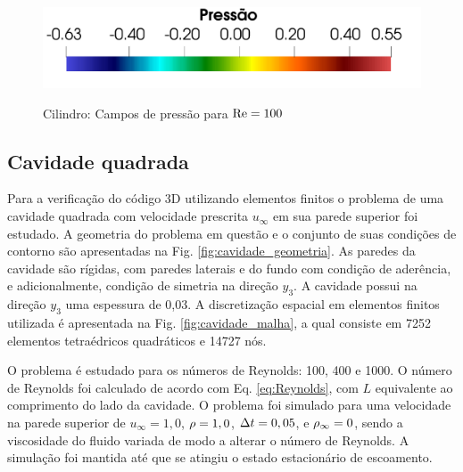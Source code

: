 \documentclass[tese_patricia]{subfiles}%
\begin{document}
\begin{figure}[htb!]
	{\includegraphics[trim=0cm 0cm 0cm 0cm,clip=true,scale=0.3]{Imagens/Cap2/cilindro_legendaPress.pdf}} \\
	\caption{Cilindro: Campos de pressão para $\mathrm{Re} = 100$}
	\label{fig:cilindro_camposPressao}
\end{figure}


\subsection{Cavidade quadrada} \label{capitulo:Cap2:VerApl:CavQuad}

Para a verificação do código 3D utilizando elementos finitos o problema de uma cavidade quadrada com velocidade prescrita $u_{\infty}$ em sua parede superior foi estudado. A geometria do problema em questão e o conjunto de suas condições de contorno são apresentadas na Fig. \ref{fig:cavidade_geometria}. As paredes da cavidade são rígidas, com paredes laterais e do fundo com condição de aderência, e adicionalmente, condição de simetria na direção $y_3$. A cavidade possui na direção $y_3$ uma espessura de 0,03. A discretização espacial em elementos finitos utilizada é apresentada na Fig.  \ref{fig:cavidade_malha}, a qual consiste em 7252 elementos tetraédricos quadráticos e 14727 nós.

O problema é estudado para os números de Reynolds: 100, 400 e 1000. O número de Reynolds foi calculado de acordo com Eq. \eqref{eq:Reynolds}, com $L$ equivalente ao comprimento do lado da cavidade. O problema foi simulado para uma velocidade na parede superior de $u_{\infty} = 1,0$, $\rho = 1,0$, $\Delta t = 0,05$, e $\rho_\infty = 0$, sendo a viscosidade do fluido variada de modo a alterar o número de Reynolds. A simulação foi mantida até que se atingiu o estado estacionário de escoamento. 
\end{document}
